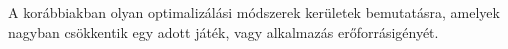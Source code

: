 \label{Chap:osszegzes}


A korábbiakban olyan optimalizálási módszerek kerületek bemutatásra, amelyek nagyban csökkentik egy adott játék, vagy alkalmazás erőforrásigényét.
